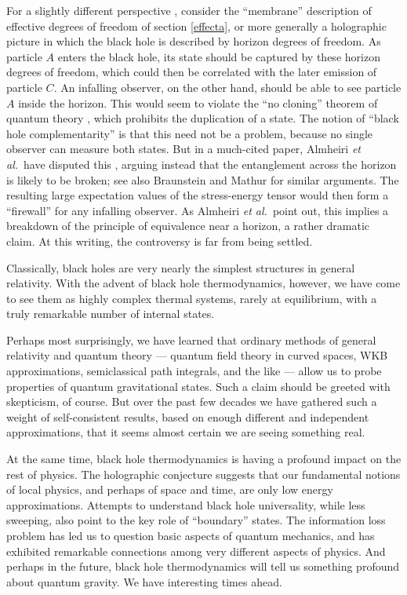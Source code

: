 \documentclass[11pt]{article}
\makeatletter
\def\section{\@startsection{section}{1}{\z@}{3.5ex plus 1ex minus
   .2ex}{2.3ex plus .2ex}{\large\bf}}
\makeatother
\begin{document}
For a slightly different perspective \cite{STU}, consider the ``membrane''
description of effective degrees of freedom of section \ref{effecta},
or more generally a holographic picture in which the black hole is 
described by horizon degrees of freedom.  As particle $A$ enters
the black hole, its state should be captured by these horizon 
degrees of freedom, which could then be correlated with the 
later emission of particle $C$.  An infalling observer, on the other
hand, should be able to see particle $A$ inside the horizon.  This
would seem to violate the ``no cloning'' theorem of quantum 
theory \cite{clone}, which prohibits the duplication of a state.
The notion of ``black hole complementarity'' is that this need 
not be a problem, because no single observer can 
measure both states.  But in a much-cited paper, Almheiri {\it et al.}\ 
have disputed this \cite{AMPS}, arguing instead that the entanglement 
across the horizon is likely to be broken; see also Braunstein 
\cite{Braun} and Mathur \cite{Mathur_info} for similar arguments.  The
resulting large expectation values of the stress-energy tensor would
then form a ``firewall'' for any infalling observer.  As Almheiri 
{\it et al.}\ point out, this implies a breakdown of the principle 
of equivalence near a horizon, a rather dramatic claim.  At this 
writing, the controversy is far from being settled.

\section{Conclusion}

Classically, black holes are very nearly the simplest structures in
general relativity.  With the advent of black hole thermodynamics,
however, we have come to see them as highly complex thermal
systems, rarely at equilibrium, with a truly remarkable number of
internal states.  

Perhaps most surprisingly, we have learned that ordinary methods
of general relativity and quantum theory --- quantum field theory
in curved spaces, WKB approximations, semiclassical path integrals,
and the like --- allow us to probe properties of quantum gravitational
states.  Such a claim should be greeted with skepticism, of course.
But over the past few decades we have gathered such a weight of
self-consistent results, based on enough different and independent
approximations, that it seems almost certain we are seeing something 
real.

At the same time, black hole thermodynamics is having a profound
impact on the rest of physics.  The holographic conjecture suggests 
that our fundamental notions of local physics, and perhaps of space
and time, are only low energy approximations.  Attempts to
understand black hole universality, while less sweeping, also point
to the key role of ``boundary'' states.  The information loss problem
has led us to question basic aspects of quantum mechanics, and has
exhibited remarkable connections among very different aspects of
physics.  And perhaps in the future, black hole thermodynamics
will tell us something profound about quantum gravity.
We have interesting times ahead.
\end{document}
